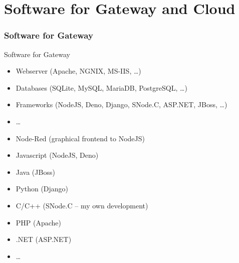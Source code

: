 ﻿\part{Software for Gateway and Cloud}
\section{Software for Gateway}

\begin{frame}{Software for Gateway}
  \begin{description}[Languages]
    \item[Tools]
    \begin{itemize}
      \item Webserver (Apache, NGNIX, MS-IIS, \ldots)
      \item Databases (SQLite, MySQL, \alert<2>{MariaDB}, PostgreSQL, \ldots)
      \item Frameworks (\alert<2>{NodeJS}, Deno, Django, \alert<2>{SNode.C}, ASP.NET, JBoss, \ldots)
      \item \ldots
    \end{itemize}
    \item[Languages]
    \begin{itemize}
      \item \alert<2>{Node-Red (graphical frontend to NodeJS)}
      \item \alert<2>{Javascript} (\alert<2>{NodeJS}, Deno)
      \item Java (JBoss)
      \item Python (Django)
      \item \alert<2>{C/C++ (SNode.C -- my own development)}
      \item PHP (Apache)
      \item .NET (ASP.NET)
      \item \ldots
    \end{itemize}
  \end{description}
\end{frame}
